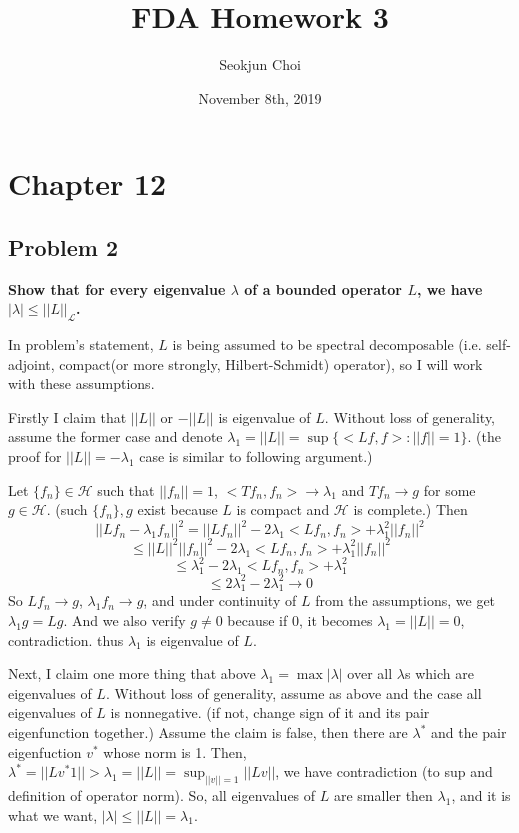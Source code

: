 \documentclass{article}
\begin{document}
\title{FDA Homework 3}
\author{Seokjun Choi}
\date{November 8th, 2019}
\maketitle

\section{Chapter 12}
\subsection{Problem 2}
\textbf{
Show that for every eigenvalue $\lambda$ of a bounded operator $L$,
we have $|\lambda|\leq||L||_{\mathcal{L}}$.
}

In problem's statement, $L$ is being assumed to be spectral decomposable 
(i.e. self-adjoint, compact(or more strongly, Hilbert-Schmidt) operator), so I will work with these assumptions.

Firstly I claim that $||L||$ or $-||L||$ is eigenvalue of $L$.
Without loss of generality, assume the former case and denote $\lambda_1=||L||=\sup\{<Lf,f>:||f||=1\}$.
(the proof for $||L||=-\lambda_1$ case is similar to following argument.)

Let $\{f_n\}\in\mathcal{H}$ such that $||f_n||=1$, $<Tf_n,f_n>\rightarrow\lambda_1$ 
and $Tf_n\rightarrow g$ for some $g\in\mathcal{H}$.
(such $\{f_n\},g$ exist because $L$ is compact and $\mathcal{H}$ is complete.)
Then
\[||Lf_n-\lambda_1 f_n||^2=||Lf_n||^2-2\lambda_1<Lf_n,f_n>+\lambda_1^2||f_n||^2\]
\[\leq ||L||^2||f_n||^2-2\lambda_1<Lf_n,f_n>+\lambda_1^2||f_n||^2\]
\[\leq \lambda_1^2-2\lambda_1<Lf_n,f_n>+\lambda_1^2\]
\[\leq 2\lambda_1^2-2\lambda_1^2\rightarrow 0\]
So $Lf_n\rightarrow g$, $\lambda_1 f_n\rightarrow g$, and under continuity of $L$ from the assumptions,
we get $\lambda_1 g = Lg$. And we also verify $g\neq0$ because if 0, it becomes $\lambda_1=||L||=0$, contradiction.
thus $\lambda_1$ is eigenvalue of $L$.


Next, I claim one more thing that above $\lambda_1=\max{|\lambda|}$ over all $\lambda$s which are eigenvalues of $L$.
Without loss of generality, assume as above and the case all eigenvalues of $L$ is nonnegative. 
(if not, change sign of it and its pair eigenfunction together.)
Assume the claim is false, then there are $\lambda^*$ and the pair eigenfuction $v^*$ whose norm is 1.
Then, $\lambda^*=||Lv^*1||>\lambda_1=||L||=\sup_{||v||=1}||Lv||$, we have contradiction (to sup and definition of operator norm).
So, all eigenvalues of $L$ are smaller then $\lambda_1$, and it is what we want,
$|\lambda|\leq||L||=\lambda_1$.
\end{document}
